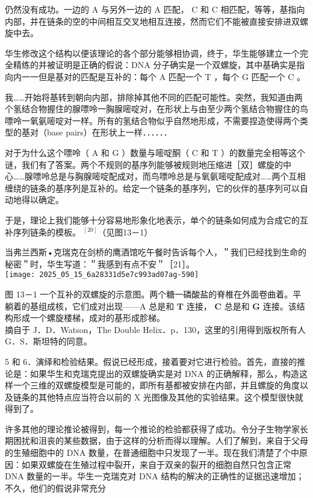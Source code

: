 仍然没有成功。一边的 A 与另外一边的 A 匹配， C 和 C 相匹配，等等，基指向内部，并在链条的空的中间相互交叉地相互连接，然而它们不能被直接安排进双螺旋中去。

华生修改这个结构以便该理论的各个部分能够相协调，终于，华生能够建立一个完全精练的并被证明是正确的假说：DNA 分子确实是一个双螺旋，其中基确实是指向内一一但是基对的匹配是互补的：每个 A 匹配一个 T ，每个 G 匹配一个 C 。

我……开始将基转到朝向内部，排除掉其他不同的匹配可能性。突然，我知道由两个氢结合物握住的腺嘌呤一胸腺嘧啶对，在形状上与由至少两个氢结合物握住的鸟嘌呤一氧氨嘧啶对一样。所有的氢结合物似乎自然地形成，不需要捏造使得两个类型的基对（base pairs）在形状上一样．．．．．．

对于为什么这个嘌呤（ A 和 G ）数量与嘧啶酮（ C 和 T ）的数量完全相等这个谜，我们有了答案。两个不规则的基序列能够被规则地压缩进［双］螺旋的中心……腺嘌呤总是与胸腺嘧啶配成对，而鸟嘌呤总是与氧氨嘧啶配成对……两个互相缠绕的链条的基序列是互补的。给定一个链条的基序列，它的伙伴的基序列可以自动地得以确定。

于是，理论上我们能够十分容易地形象化地表示，单个的链条如何成为合成它的互补序列链条的模板。 ${ }^{[20]}$（见图13－1）

当弗兰西斯•克瑞克在剑桥的鹰酒馆吃午餐时告诉每个人，＂我们已经找到生命的秘密＂时，华生写道：＂我感到有点不安＂［21］。\\
\texttt{[image: 2025\_05\_15\_6a28331d5e7c993ad07ag-590]}

图 13－1 一个互补的双螺旋的示意图。两个糖一磷酸盐的脊椎在外面卷曲着。平躺着的基组成核，它们成对出现——A 总是和 $\mathbf{T}$ 连接， $\mathbf{C}$ 总是和 $\mathbf{G}$ 连接。该结构形成一个螺旋楼梯，成对的基形成胗梯。\\
摘自于 J．D．Watson，The Double Helix．p．130，这里的引用得到版权所有人 G．S．斯坦特的同意。

5 和 6．演绎和检验结果。假说已经形成，接着要对它进行检验。首先，直接的推论是：如果华生和克瑞克提出的双螺旋确实是对 DNA 的正确解释，那么，构造这样一个三维的双螺旋模型是可能的，即所有基都被安排在内部，并且螺旋的角度以及链条的其他特点应当符合以前的 X 光图像及其他的实验结果。这个模型很快就得到了。

许多其他的理论推论被得到，每一个推论的检验都获得了成功。令分子生物学家长期困扰和沮丧的某些数据，由于这样的分析而得以理解。人们了解到，来自于父母的生殖细胞中的 DNA 数量，在普通细胞中只发现了一半。现在我们清楚了个中原因：如果双螺旋在生殖过程中裂开，来自于双亲的裂开的细胞自然只包含正常 DNA 数量的一半。华生一克瑞克对 DNA 结构的解决的正确性的证据迅速增加；不久，他们的假说非常充分

